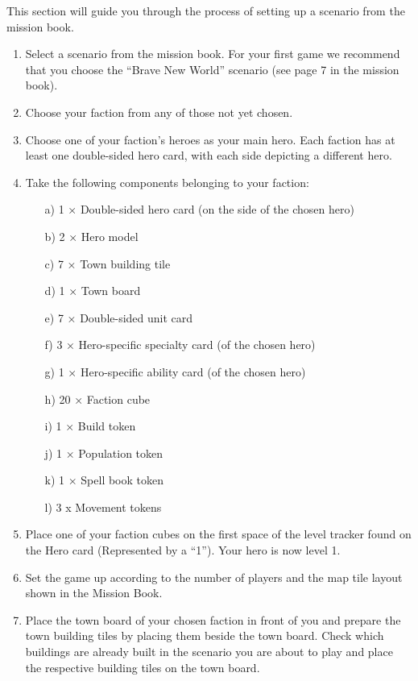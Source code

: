 This section will guide you through the process of setting up a scenario from the mission book.

\begin{enumerate}
  \item Select a scenario from the mission book.
    For your first game we recommend that you choose the “Brave New World” scenario (see page 7 in the mission book).
  \item Choose your faction from any of those not yet chosen.
  \item Choose one of your faction’s heroes as your main hero.
    Each faction has at least one double-sided hero card, with each side depicting a different hero.
  \item Take the following components belonging to your faction:
  \begin{itemize}
    \item[a)]1 × Double-sided hero card (on the side of the chosen hero)
    \item[b)]2 × Hero model
    \item[c)]7 × Town building tile
    \item[d)]1 × Town board
    \item[e)]7 × Double-sided unit card
    \item[f)]3 × Hero-specific specialty card (of the chosen hero)
    \item[g)]1 × Hero-specific ability card (of the chosen hero)
    \item[h)]20 × Faction cube
    \item[i)]1 × Build token
    \item[j)]1 × Population token
    \item[k)]1 × Spell book token
    \item[l)]3 x Movement tokens
  \end{itemize}
  \item Place one of your faction cubes on the first space of the level tracker found on the Hero card (Represented by a “1”).
    Your hero is now level 1.
  \item Set the game up according to the number of players and the map tile layout shown in the Mission Book.
  \item Place the town board of your chosen faction in front of you and prepare the town building tiles by placing them beside the town board.
    Check which buildings are already built in the scenario you are about to play and place the respective building tiles on the town board.

\end{enumerate}
